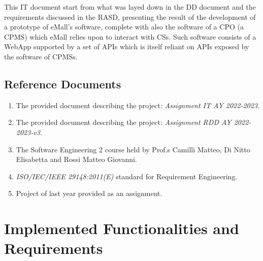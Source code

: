 \documentclass[11pt]{article}
\begin{document}
This IT document start from what was layed down in the DD document and the requirements discussed in the RASD, presenting the result of the development of a prototype of eMall's software, complete with also the software of a CPO (a CPMS) which eMall relies upon to interact with CSs. Such software consists of a WebApp supported by a set of APIs which is itself reliant on APIs exposed by the software of CPMSs.

\subsection{Reference Documents}

\begin{enumerate}
    \item The provided document describing the project: \textit{Assignment IT AY 2022-2023}.
    \item The provided document describing the project: \textit{Assignment RDD AY 2022-2023-v3}.
    \item The Software Engineering 2 course held by Prof.s Camilli Matteo, Di Nitto Elisabetta and Rossi Matteo Giovanni.
    \item \textit{ISO/IEC/IEEE 29148:2011(E)} standard for Requirement Engineering.
    \item Project of last year provided as an assignment.
\end{enumerate}

\newpage

\section{Implemented Functionalities and Requirements}
\end{document}
